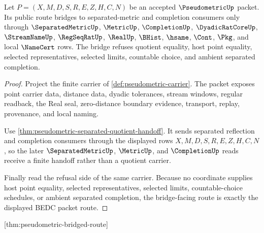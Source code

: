 \begin{theorem}
\label{thm:pseudometric-bridged-route}
Let $P=(X,M,D,S,R,E,Z,H,C,N)$ be an accepted $\PseudometricUp$ packet. Its public route bridges to separated-metric and completion consumers only through $\SeparatedMetricUp$, $\MetricUp$, $\CompletionUp$, $\DyadicRatCoreUp$, $\StreamNameUp$, $\RegSeqRatUp$, $\RealUp$, $\BHist$, $\hsame$, $\Cont$, $\Pkg$, and local $\NameCert$ rows. The bridge refuses quotient equality, host point equality, selected representatives, selected limits, countable choice, and ambient separated completion.
\end{theorem}
\begin{proof}
Project the finite carrier of \autoref{def:pseudometric-carrier}. The packet exposes point carrier data, distance data, dyadic tolerances, stream windows, regular readback, the Real seal, zero-distance boundary evidence, transport, replay, provenance, and local naming.

Use \autoref{thm:pseudometric-separated-quotient-handoff}. It sends separated reflection and completion consumers through the displayed rows $X,M,D,S,R,E,Z,H,C,N$, so the later $\SeparatedMetricUp$, $\MetricUp$, and $\CompletionUp$ reads receive a finite handoff rather than a quotient carrier.

Finally read the refusal side of the same carrier. Because no coordinate supplies host point equality, selected representatives, selected limits, countable-choice schedules, or ambient separated completion, the bridge-facing route is exactly the displayed BEDC packet route.
\end{proof}

[thm:pseudometric-bridged-route]

